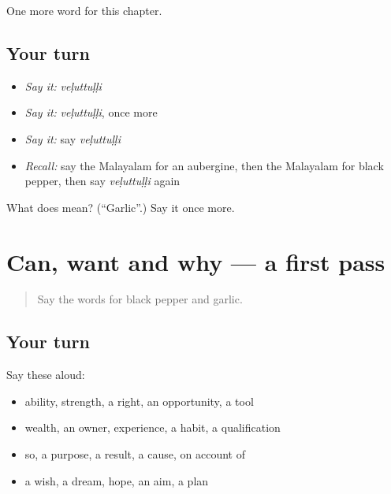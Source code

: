 \begin{grammarlens}[title={What you've built}]
One more word for this chapter.
\end{grammarlens}

\subsection*{Your turn}
\begin{itemize}
\raggedright
  \item \emph{Say it:} \emph{veḷuttuḷḷi}
  \item \emph{Say it:} \emph{veḷuttuḷḷi}, once more
  \item \emph{Say it:} say \emph{veḷuttuḷḷi}
  \item \emph{Recall:} say the Malayalam for an aubergine, then the Malayalam for black pepper, then say \emph{veḷuttuḷḷi} again
\end{itemize}

\begin{tcolorbox}[breakable,colback=teal!4,colframe=teal!35!black,title={Before you move on}]
What does  mean? (\textquotedblleft{}Garlic\textquotedblright{}.) Say it once more.
\end{tcolorbox}
\section[(dialogue)]{Can, want and why — a first pass}

\label{lesson:ML-R150-first-pass-can-want-and-why}



\begin{quote}
Say the words for black pepper and garlic.
\end{quote}

\subsection*{Your turn}
Say these aloud:

\begin{itemize}
\raggedright
  \item ability, strength, a right, an opportunity, a tool
  \item wealth, an owner, experience, a habit, a qualification
  \item so, a purpose, a result, a cause, on account of
  \item a wish, a dream, hope, an aim, a plan
\end{itemize}

